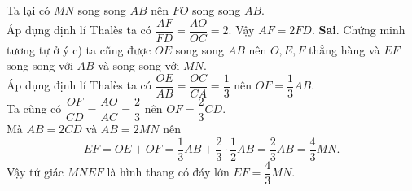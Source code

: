 \begin{ex}
{\begin{itemchoice}
   Ta lại có  $MN$ song song $AB$ nên $FO$ song song $AB$.\\
   Áp dụng định lí Thalès ta có  $\dfrac{AF}{FD}=\dfrac{AO}{OC}=2$.
   Vậy $AF=2FD$. 
   \itemch \textbf{Sai}. Chứng minh tương tự ở ý c) ta cũng được $OE$ song song $AB$ nên $O, E, F$ thẳng hàng và $EF$ song song với $AB$ và song song với  $MN$.\\
    Áp dụng định lí Thalès ta có $\dfrac{OE}{AB}=\dfrac{OC}{CA}=\dfrac{1}{3}$ nên $OF=\dfrac{1}{3}AB$.\\
   Ta cũng có $\dfrac{OF}{CD}=\dfrac{AO}{AC}=\dfrac{2}{3}$  nên $OF=\dfrac{2}{3}CD$.\\
    Mà $AB=2CD$ và $AB=2MN$ nên $$EF=OE+OF=\dfrac{1}{3}AB+\dfrac{2}{3}\cdot\dfrac{1}{2}AB=\dfrac{2}{3}AB=\dfrac{4}{3}MN.$$
   Vậy tứ  giác $MNEF$ là hình thang có đáy lớn $EF=\dfrac{4}{3}MN$.
  \end{itemchoice}
  }
\end{ex}


